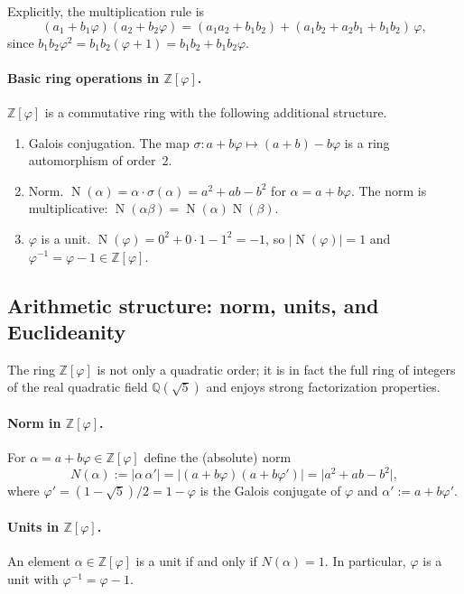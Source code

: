 \documentclass[11pt,reqno]{amsart}
\theoremstyle{plain}
\theoremstyle{definition}
\theoremstyle{remark}
\newcommand{\phig}{\varphi}
\newcommand{\ZZ}{\mathbb{Z}}
\newcommand{\QQ}{\mathbb{Q}}
\DeclareMathOperator{\Nm}{N} %
\newcommand{\conj}{\sigma} %
\newcommand{\1}{\mathbf{1}}
\begin{document}
Explicitly, the multiplication rule is
\begin{equation}\label{eq:phi-mul} (a_1+b_1\phig)(a_2+b_2\phig) =(a_1a_2+b_1b_2)+(a_1b_2+a_2b_1+b_1b_2)\,\phig,
\end{equation}
since $b_1b_2\phig^2=b_1b_2(\phig+1)=b_1b_2+b_1b_2\phig$. \paragraph{Basic ring operations in $\ZZ[\phig]$.}\label{thm:phi-ring}
$\ZZ[\phig]$ is a commutative ring with the following additional
structure.
\begin{enumerate}[nosep,label=\textup{(\alph*)}]
\item Galois conjugation. The map $\conj:a+b\phig\mapsto(a{+}b)-b\phig$ is a ring automorphism of order~$2$.
\item Norm. $\Nm(\alpha)=\alpha\cdot\conj(\alpha)=a^2+ab-b^2$ for $\alpha=a+b\phig$. The norm is multiplicative: $\Nm(\alpha\beta)=\Nm(\alpha)\Nm(\beta)$.
\item $\phig$ is a unit. $\Nm(\phig)=0^2+0\cdot1-1^2=-1$, so $|\Nm(\phig)|=1$ and $\phig^{-1}=\phig-1\in\ZZ[\phig]$.
\end{enumerate}

\subsection{Arithmetic structure: norm, units, and Euclideanity} The ring $\ZZ[\phig]$ is not only a quadratic order; it is in fact the full
ring of integers of the real quadratic field $\QQ(\sqrt5)$ and enjoys strong
factorization properties. \paragraph{Norm in $\ZZ[\phig]$.}\label{def:phi-norm}
For $\alpha=a+b\phig\in\ZZ[\phig]$ define the (absolute) norm
\[
 N(\alpha):=\bigl|\alpha\,\alpha'\bigr|
 =\bigl|(a+b\phig)(a+b\phig')\bigr|
 =\bigl|a^2+ab-b^2\bigr|,
\]
where $\phig'=(1-\sqrt5)/2=1-\phig$ is the Galois conjugate of $\phig$ and $\alpha':=a+b\phig'$.
 

\paragraph{Units in $\ZZ[\phig]$.}\label{prop:phi-units}
An element $\alpha\in\ZZ[\phig]$ is a unit if and only if $N(\alpha)=1$.
In particular, $\phig$ is a unit with $\phig^{-1}=\phig-1$.
\end{document}
